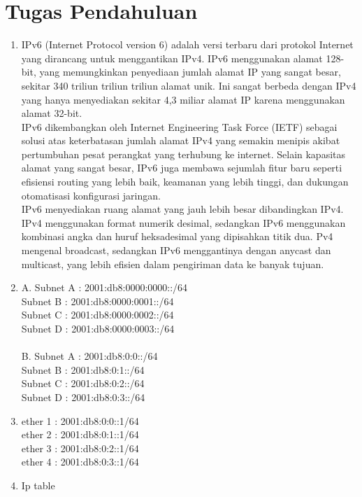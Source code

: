 \section{Tugas Pendahuluan}
\begin{enumerate}
	\item IPv6 (Internet Protocol version 6) adalah versi terbaru dari protokol Internet yang dirancang untuk menggantikan IPv4. IPv6 menggunakan alamat 128-bit, yang memungkinkan penyediaan jumlah alamat IP yang sangat besar, sekitar 340 triliun triliun triliun alamat unik. Ini sangat berbeda dengan IPv4 yang hanya menyediakan sekitar 4,3 miliar alamat IP karena menggunakan alamat 32-bit. \\ IPv6 dikembangkan oleh Internet Engineering Task Force (IETF) sebagai solusi atas keterbatasan jumlah alamat IPv4 yang semakin menipis akibat pertumbuhan pesat perangkat yang terhubung ke internet. Selain kapasitas alamat yang sangat besar, IPv6 juga membawa sejumlah fitur baru seperti efisiensi routing yang lebih baik, keamanan yang lebih tinggi, dan dukungan otomatisasi konfigurasi jaringan. \\ IPv6 menyediakan ruang alamat yang jauh lebih besar dibandingkan IPv4. IPv4 menggunakan format numerik desimal, sedangkan IPv6 menggunakan kombinasi angka dan huruf heksadesimal yang dipisahkan titik dua. Pv4 mengenal broadcast, sedangkan IPv6 menggantinya dengan anycast dan multicast, yang lebih efisien dalam pengiriman data ke banyak tujuan.
	\item A. Subnet A : 2001:db8:0000:0000::/64 \\ Subnet B : 2001:db8:0000:0001::/64 \\ Subnet C : 2001:db8:0000:0002::/64 \\ Subnet D : 2001:db8:0000:0003::/64 \\\\ B. Subnet A : 2001:db8:0:0::/64 \\ Subnet B : 2001:db8:0:1::/64 \\ Subnet C : 2001:db8:0:2::/64 \\ Subnet D : 2001:db8:0:3::/64
	\item ether 1 : 2001:db8:0:0::1/64 \\ ether 2 : 2001:db8:0:1::1/64 \\ ether 3 : 2001:db8:0:2::1/64 \\ ether 4 : 2001:db8:0:3::1/64
	\item Ip table 
	\begin{figure}[H]

\end{figure}
\end{enumerate}

